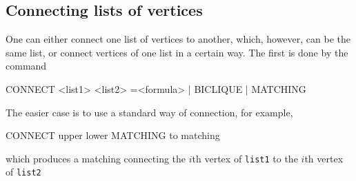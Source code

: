 \subsection{Connecting lists of vertices}

One can either connect one list of vertices to another, which, however, can be the same list, or connect vertices of one list in a certain way. The first is done by the command

\begin{tcolorbox}[colback=lightpink]
  CONNECT <list1> <list2> =<formula> | BICLIQUE | MATCHING
\end{tcolorbox}

The easier case is to use a standard way of connection, for example,

\begin{tcolorbox}[colback=palegreen]
  CONNECT upper lower MATCHING to matching
\end{tcolorbox}
which produces a matching connecting the $i$th vertex of
\texttt{list1} to the $i$th vertex of \texttt{list2}

